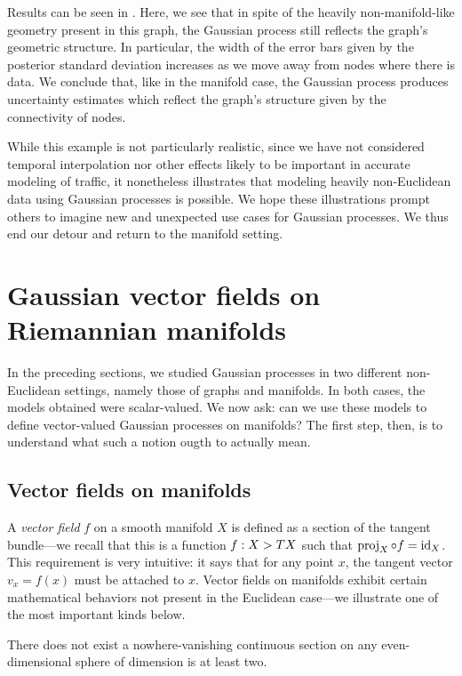 \documentclass[11pt]{book}
\begin{document}
Results can be seen in .
Here, we see that in spite of the heavily non-manifold-like geometry present in this graph, the Gaussian process still reflects the graph's geometric structure.
In particular, the width of the error bars given by the posterior standard deviation increases as we move away from nodes where there is data.
We conclude that, like in the manifold case, the Gaussian process produces uncertainty estimates which reflect the graph's structure given by the connectivity of nodes.

While this example is not particularly realistic, since we have not considered temporal interpolation nor other effects likely to be important in accurate modeling of traffic, it nonetheless illustrates that modeling heavily non-Euclidean data using Gaussian processes is possible.
We hope these illustrations prompt others to imagine new and unexpected use cases for Gaussian processes.
We thus end our detour and return to the manifold setting.

\section{Gaussian vector fields on Riemannian manifolds}

In the preceding sections, we studied Gaussian processes in two different non-Euclidean settings, namely those of graphs and manifolds.
In both cases, the models obtained were scalar-valued.
We now ask: can we use these models to define vector-valued Gaussian processes on manifolds?
The first step, then, is to understand what such a notion ougth to actually mean.

\subsection{Vector fields on manifolds}

A \emph{vector field} $f$ on a smooth manifold $X$ is defined as a section of the tangent bundle---we recall that this is a function $f : X \-> TX$ such that $\operatorname{proj}_X \circ f = \operatorname{id}_X$.
This requirement is very intuitive: it says that for any point $x$, the tangent vector $v_x = f(x)$ must be attached to $x$.
Vector fields on manifolds exhibit certain mathematical behaviors not present in the Euclidean case---we illustrate one of the most important kinds below.

\begin{result}
There does not exist a nowhere-vanishing continuous section on any even-dimensional sphere of dimension is at least two.
\end{result}
\end{document}
